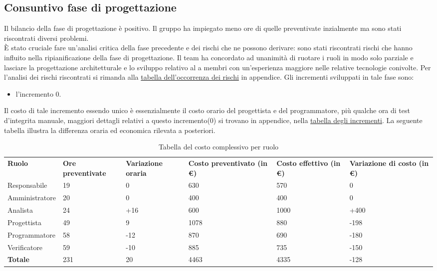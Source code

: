 \subsection{Consuntivo fase di progettazione}
Il bilancio della fase di progettazione è positivo. Il gruppo ha impiegato meno ore di quelle preventivate inzialmente ma sono stati riscontrati diversi problemi.\\
È stato cruciale fare un'analisi critica della fase precedente e dei rischi che ne possono derivare: sono stati riscontrati rischi che hanno influito nella ripianificazione della fase di progettazione.
Il team ha concordato ad unanimità di ruotare i ruoli in modo solo parziale e lasciare la progettazione architetturale e lo sviluppo relativo al  a membri con un'esperienza maggiore nelle relative tecnologie conivolte.
Per l'analisi dei rischi riscontrati si rimanda alla \hypersetup{
    linkcolor=blue
} \hyperlink{Tabellaoccorrenzarischi}{tabella dell'occorrenza dei rischi} 
\hypersetup{
    linkcolor=black
}
in appendice.
Gli incrementi sviluppati in tale fase sono:\\
\begin{itemize}
	\item l'incremento 0. 
\end{itemize}
Il costo di tale incremento essendo unico è essenzialmente il costo orario del progettista e del programmatore, più qualche ora di test d'integrita manuale, maggiori dettagli relativi a questo incremento(0) si trovano in appendice, nella 
\hypersetup{
    linkcolor=blue
}
\hyperlink{TabellaIncrementi}{tabella degli incrementi}.\hypersetup{
    linkcolor=black
}
La seguente tabella illustra la differenza oraria ed economica rilevata a posteriori.
{
\renewcommand{\arraystretch}{2}
\begin{longtable}[h]{ C{2.5cm} C{2cm} C{1.8cm} C{2.2cm} C{1.5cm} C{2.3cm}}
\caption{Tabella del costo complessivo per ruolo}\\
\rowcolor{\primaryColor}

\textcolor{\secondaryColor}{\textbf{Ruolo}} & 
\textcolor{\secondaryColor}{\textbf{Ore preventivate}} & 
\textcolor{\secondaryColor}{\textbf{Variazione oraria}} & 
\textcolor{\secondaryColor}{\textbf{Costo preventivato (in \euro{})}} & 
\textcolor{\secondaryColor}{\textbf{Costo effettivo (in \euro{})}} & 
\textcolor{\secondaryColor}{\textbf{Variazione di costo (in \euro{})}}\\	
	
Responsabile    &  19 & 0 & 630 & 570 &  0 \\
Amministratore  &  20 & 0 & 400 & 400 & 0 \\
Analista        & 24 & +16 & 600 & 1000 & +400 \\
Progettista     &  49 & 9 & 1078 & 880 & -198 \\
Programmatore   &   58 & -12 & 870 &  690 & -180 \\
Verificatore    &  59 &  -10 & 885 & 735 & -150 \\
\textbf{Totale} & 231 & 20 & 4463 & 4335 & -128 \\	
\end{longtable}
}

